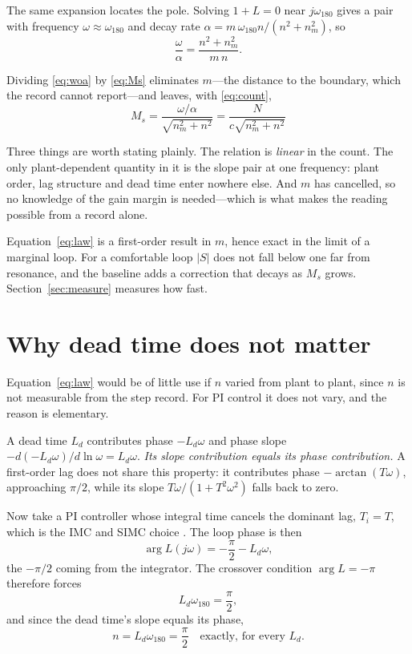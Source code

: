 \documentclass[final,3p,times,twocolumn]{elsarticle}
\begin{document}
The same expansion locates the pole. Solving $1+L=0$ near
$j\omega_{180}$ gives a pair with frequency $\omega\approx\omega_{180}$
and decay rate $\alpha=m\,\omega_{180}n/(n^2+n_m^2)$, so
\begin{equation}
\frac{\omega}{\alpha}=\frac{n^2+n_m^2}{m\,n}.
\label{eq:woa}
\end{equation}

Dividing \eqref{eq:woa} by \eqref{eq:Ms} eliminates $m$---the distance
to the boundary, which the record cannot report---and leaves, with
\eqref{eq:count},
\begin{equation}
\boxed{\;M_s=\frac{\omega/\alpha}{\sqrt{n_m^2+n^2}}
=\frac{N}{c\sqrt{n_m^2+n^2}}\;}
\label{eq:law}
\end{equation}

Three things are worth stating plainly. The relation is \emph{linear} in
the count. The only plant-dependent quantity in it is the slope pair at
one frequency: plant order, lag structure and dead time enter nowhere
else. And $m$ has cancelled, so no knowledge of the gain margin is
needed---which is what makes the reading possible from a record alone.

Equation~\eqref{eq:law} is a first-order result in $m$, hence exact in
the limit of a marginal loop. For a comfortable loop $|S|$ does not fall
below one far from resonance, and the baseline adds a correction that
decays as $M_s$ grows. Section~\ref{sec:measure} measures how fast.

\section{Why dead time does not matter}
\label{sec:delay}

Equation~\eqref{eq:law} would be of little use if $n$ varied from plant
to plant, since $n$ is not measurable from the step record. For PI
control it does not vary, and the reason is elementary.

A dead time $L_d$ contributes phase $-L_d\omega$ and phase slope
$-d(-L_d\omega)/d\ln\omega=L_d\omega$. \emph{Its slope contribution
equals its phase contribution.} A first-order lag does not share this
property: it contributes phase $-\arctan(T\omega)$, approaching $\pi/2$,
while its slope $T\omega/(1+T^2\omega^2)$ falls back to zero.

Now take a PI controller whose integral time cancels the dominant lag,
$T_i=T$, which is the IMC and SIMC choice \cite{Skogestad2003}. The loop
phase is then
\begin{equation}
\arg L(j\omega)=-\frac{\pi}{2}-L_d\omega ,
\label{eq:argL}
\end{equation}
the $-\pi/2$ coming from the integrator. The crossover condition
$\arg L=-\pi$ therefore forces
\begin{equation}
L_d\omega_{180}=\frac{\pi}{2},
\label{eq:pin}
\end{equation}
and since the dead time's slope equals its phase,
\begin{equation}
n=L_d\omega_{180}=\frac{\pi}{2}\quad\text{exactly, for every }L_d .
\label{eq:npi2}
\end{equation}
\end{document}
